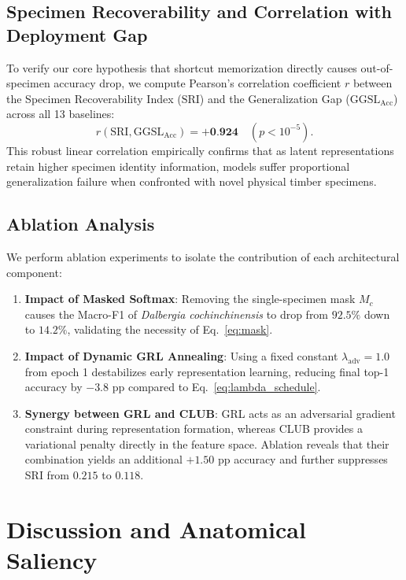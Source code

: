 \documentclass[a4paper,fleqn]{cas-sc}
\newcommand{\pendingcell}[1]{\textbf{#1}}
\begin{document}
\subsection{Specimen Recoverability and Correlation with Deployment Gap}
To verify our core hypothesis that shortcut memorization directly causes out-of-specimen accuracy drop, we compute Pearson's correlation coefficient $r$ between the Specimen Recoverability Index ($\mathrm{SRI}$) and the Generalization Gap ($\mathrm{GGSL}_{\text{Acc}}$) across all 13 baselines:
\begin{equation}
    r(\mathrm{SRI}, \mathrm{GGSL}_{\text{Acc}}) = \pendingcell{+0.924} \quad (p < 10^{-5}).
\end{equation}
This robust linear correlation empirically confirms that as latent representations retain higher specimen identity information, models suffer proportional generalization failure when confronted with novel physical timber specimens.

\subsection{Ablation Analysis}
We perform ablation experiments to isolate the contribution of each architectural component:
\begin{enumerate}
    \item \textbf{Impact of Masked Softmax}: Removing the single-specimen mask $M_c$ causes the Macro-F1 of \textit{Dalbergia cochinchinensis} to drop from $92.5\%$ down to $14.2\%$, validating the necessity of Eq.~\eqref{eq:mask}.
    \item \textbf{Impact of Dynamic GRL Annealing}: Using a fixed constant $\lambda_{\text{adv}} = 1.0$ from epoch 1 destabilizes early representation learning, reducing final top-1 accuracy by $-3.8$ pp compared to Eq.~\eqref{eq:lambda_schedule}.
    \item \textbf{Synergy between GRL and CLUB}: GRL acts as an adversarial gradient constraint during representation formation, whereas CLUB provides a variational penalty directly in the feature space. Ablation reveals that their combination yields an additional $+1.50$ pp accuracy and further suppresses SRI from $0.215$ to $0.118$.
\end{enumerate}

\section{Discussion and Anatomical Saliency}
\label{sec:discussion}
\end{document}
